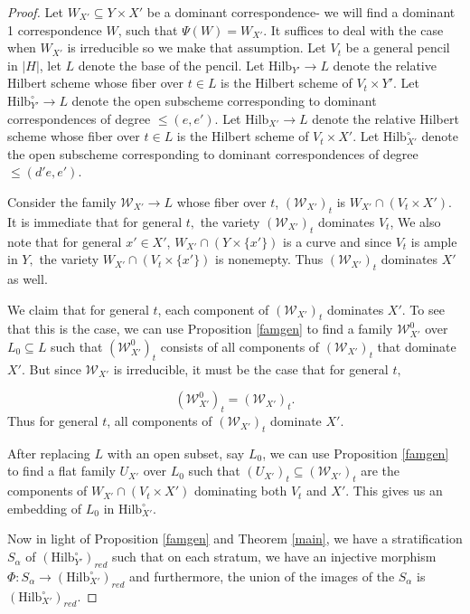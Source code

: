 \documentclass[12pt]{amsart}
\numberwithin{equation}{section}
\numberwithin{theorem}{section}
\theoremstyle{definition}
\theoremstyle{definition}
\newcommand{\Hilb}{\mathrm{Hilb}}
\begin{document}
\begin{proof}
    Let $W_{X'} \subseteq Y \times X'$ be a dominant correspondence- we will find a dominant 1 correspondence $W$, such that $\Psi(W) = W_{X'}$.  It suffices to deal with the case when $W_{X'}$ is irreducible so we make that assumption.
Let $V_t$  be a general pencil in $|H|$, let $L$ denote the base of the pencil. Let $\Hilb_{Y'} \to L$ denote the relative Hilbert scheme whose fiber over $t \in L$ is the Hilbert scheme of $V_t \times Y'$. Let $\Hilb^{\circ}_{Y'} \to L$ denote the open subscheme corresponding to dominant correspondences of degree $\le (e,e')$. 
Let $\Hilb_{X'} \to L$ denote the relative Hilbert scheme whose fiber over $t \in L$ is the Hilbert scheme of $V_t \times X'$. Let $\Hilb^{\circ}_{X'}$ denote the open subscheme corresponding to dominant correspondences of  degree $\le (d' e ,e')$.

Consider the family $\mathcal{W}_{X'} \to L$ whose fiber over $t$, $(\mathcal{W}_{X'})_t$ is   $W_{X'} \cap (V_t \times {X'})$. It is immediate that for general $t, $ the variety $(\mathcal{W}_{X'})_t$ dominates $V_t$, We also note that for general $x' \in X'$,  $W_{X'} \cap (Y \times \{x'\})$ is a curve and since $V_t$ is ample in $Y, $ the variety $W_{X'} \cap (V_t \times \{x'\})$ is nonemepty. Thus $(\mathcal{W}_{X'})_t$ dominates $X'$ as well.

We claim that for general $t$, each component of $(\mathcal{W}_{X'})_t$ dominates  $X'$. To see that this is the case,  we can use Proposition \ref{famgen} to find a family $\mathcal{W}^0_{X'}$ over $L_0 \subseteq L$ such that $({\mathcal{W}^0_{X'}})_t$ consists of all components of $({\mathcal{W}_{X'}})_t$ that dominate $X'$. But since $\mathcal{W}_{X'}$ is irreducible, it must be the case that for general $t,$ 

$$({\mathcal{W}^0_{X'}})_t = ({\mathcal{W}_{X'}})_t.$$
Thus for general $t$, all components of $({\mathcal{W}_{X'}})_t$ dominate $X'$. 

After replacing $L$ with an open subset, say $L_0$, we can use Proposition \ref{famgen} to find a flat family $U_{X'}$ over $L_0$ such that $(U_{X'})_t \subseteq ({\mathcal{W}_{X'}})_t $ are the components of $W_{X'} \cap (V_t \times X')$ dominating both $V_t$ and $X'$. This gives us an embedding of $L_0$ in $\Hilb^{\circ} _{X'}$.





Now in light of Proposition \ref{famgen} and Theorem \ref{main}, we have a stratification $S_{\alpha}$ of $(\Hilb^{\circ}_{Y'})_{red}$ such that on each stratum, we have an injective morphism $\Phi: S_{\alpha} \to (\Hilb^{\circ}_{X'})_{red}$ and furthermore, the union of the images of the $S_{\alpha}$ is $(\Hilb^{\circ}_{X'})_{red}$.



\end{proof}
\end{document}
